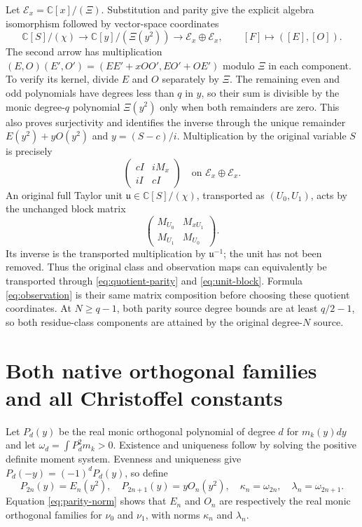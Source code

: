 \documentclass[11pt]{article}
\newcommand{\C}{\mathbb C}
\begin{document}
Let $\mathcal E_x=\C[x]/(\Xi)$. Substitution and parity give the
explicit algebra isomorphism followed by vector-space coordinates
\begin{equation}\label{eq:quotient-parity}
 \C[S]/(\chi)\longrightarrow\C[y]/(\Xi(y^2))
                  \longrightarrow\mathcal E_x\oplus\mathcal E_x,
 \qquad [F]\longmapsto([E],[O]).
\end{equation}
The second arrow has multiplication
$(E,O)(E',O')=(EE'+xOO',EO'+OE')$ modulo $\Xi$ in each component.
To verify its kernel, divide $E$ and $O$ separately by $\Xi$.
The remaining even and odd polynomials have degrees less than
$q$ in $y$, so their sum is divisible by the monic degree-$q$
polynomial $\Xi(y^2)$ only when both remainders are zero. This
also proves surjectivity and identifies the inverse through the
unique remainder $E(y^2)+yO(y^2)$ and $y=(S-c)/i$.
Multiplication by the original variable $S$ is precisely
\begin{equation}\label{eq:S-block}
 \begin{pmatrix}cI&iM_x\\ iI&cI\end{pmatrix}
 \quad\text{on }\mathcal E_x\oplus\mathcal E_x.
\end{equation}
An original full Taylor unit $\mathfrak u\in\C[S]/(\chi)$,
transported as $(U_0,U_1)$, acts by the unchanged block matrix
\begin{equation}\label{eq:unit-block}
 \begin{pmatrix}M_{U_0}&M_{xU_1}\\M_{U_1}&M_{U_0}\end{pmatrix}.
\end{equation}
Its inverse is the transported multiplication by
$\mathfrak u^{-1}$; the unit has not been removed. Thus the
original class and observation maps can equivalently be
transported through \eqref{eq:quotient-parity} and
\eqref{eq:unit-block}. Formula \eqref{eq:observation} is their
same matrix composition before choosing these quotient
coordinates. At $N\geq q-1$, both parity source degree bounds
are at least $q/2-1$, so both residue-class components are
attained by the original degree-$N$ source.

\section{Both native orthogonal families and all Christoffel constants}

Let $P_d(y)$ be the real monic orthogonal polynomial of degree $d$
for $m_k(y)dy$ and let $\omega_d=\int P_d^2m_k>0$. Existence and
uniqueness follow by solving the positive definite moment system.
Evenness and uniqueness give $P_d(-y)=(-1)^dP_d(y)$, so define
\[
 P_{2n}(y)=E_n(y^2),\quad P_{2n+1}(y)=yO_n(y^2),
 \quad \kappa_n=\omega_{2n},\quad\lambda_n=\omega_{2n+1}.
\]
Equation \eqref{eq:parity-norm} shows that $E_n$ and $O_n$ are
respectively the real monic orthogonal families for $\nu_0$ and
$\nu_1$, with norms $\kappa_n$ and $\lambda_n$.
\end{document}
